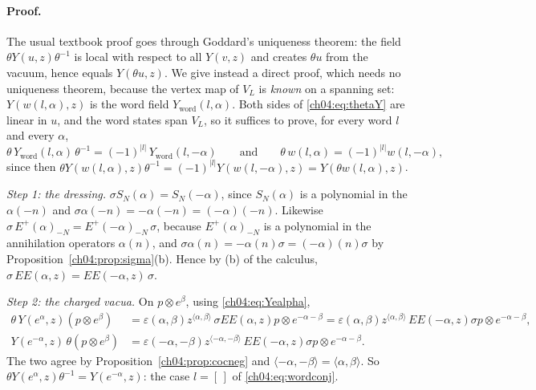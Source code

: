\paragraph{Proof.} The usual textbook proof goes through Goddard's uniqueness theorem: the field
$\theta Y(u,z)\theta^{-1}$ is local with respect to all $Y(v,z)$ and creates $\theta u$ from the vacuum,
hence equals $Y(\theta u,z)$. We give instead a direct proof, which needs no uniqueness theorem,
because the vertex map of $V_L$ is \emph{known} on a spanning set: $Y(w(l,\alpha),z)$ is the word
field $Y_{\mathrm{word}}(l,\alpha)$. Both sides of \eqref{ch04:eq:thetaY} are linear in $u$, and the
word states span $V_L$, so it suffices to prove, for every word $l$ and every $\alpha$,
\begin{equation}\label{ch04:eq:wordconj}
  \theta\,Y_{\mathrm{word}}(l,\alpha)\,\theta^{-1}=(-1)^{|l|}\,Y_{\mathrm{word}}(l,-\alpha)
  \qquad\text{and}\qquad \theta\,w(l,\alpha)=(-1)^{|l|}w(l,-\alpha),
\end{equation}
since then $\theta Y(w(l,\alpha),z)\theta^{-1}=(-1)^{|l|}Y(w(l,-\alpha),z)=Y(\theta w(l,\alpha),z)$.

\emph{Step 1: the dressing.} $\sigma S_N(\alpha)=S_N(-\alpha)$, since $S_N(\alpha)$ is a polynomial in
the $\alpha(-n)$ and $\sigma\alpha(-n)=-\alpha(-n)=(-\alpha)(-n)$. Likewise
$\sigma\,E^+(\alpha)_{-N}=E^+(-\alpha)_{-N}\,\sigma$, because $E^+(\alpha)_{-N}$ is a polynomial in the
annihilation operators $\alpha(n)$, and $\sigma\alpha(n)=-\alpha(n)\sigma=(-\alpha)(n)\sigma$ by
Proposition~\ref{ch04:prop:sigma}(b). Hence by (b) of the calculus,
$\sigma\,EE(\alpha,z)=EE(-\alpha,z)\,\sigma$.

\emph{Step 2: the charged vacua.} On $p\otimes e^\beta$, using \eqref{ch04:eq:Yealpha},
\begin{align*}
  \theta\,Y(e^\alpha,z)(p\otimes e^\beta)
  &=\varepsilon(\alpha,\beta)z^{\langle\alpha,\beta\rangle}\,\sigma EE(\alpha,z)p\otimes e^{-\alpha-\beta}
  =\varepsilon(\alpha,\beta)z^{\langle\alpha,\beta\rangle}\,EE(-\alpha,z)\sigma p\otimes e^{-\alpha-\beta},\\
  Y(e^{-\alpha},z)\,\theta(p\otimes e^\beta)
  &=\varepsilon(-\alpha,-\beta)z^{\langle-\alpha,-\beta\rangle}\,EE(-\alpha,z)\sigma p\otimes e^{-\alpha-\beta}.
\end{align*}
The two agree by Proposition~\ref{ch04:prop:cocneg} and $\langle-\alpha,-\beta\rangle=\langle\alpha,\beta\rangle$.
So $\theta Y(e^\alpha,z)\theta^{-1}=Y(e^{-\alpha},z)$: the case $l=[\,]$ of \eqref{ch04:eq:wordconj}.

